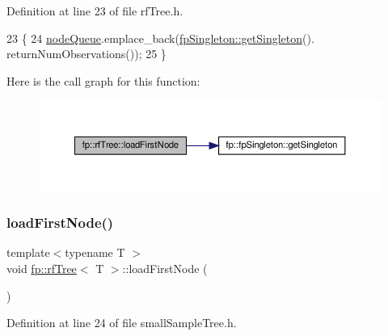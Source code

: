 Definition at line 23 of file rf\+Tree.\+h.


\begin{DoxyCode}
23                                     \{
24                     \hyperlink{classfp_1_1rfTree_af72d0a2f930fd480dfb4858885c2df23}{nodeQueue}.emplace\_back(\hyperlink{classfp_1_1fpSingleton_a8bdae77b68521003e3fc630edec2e240}{fpSingleton::getSingleton}().
      returnNumObservations());
25                 \}
\end{DoxyCode}
Here is the call graph for this function\+:
\nopagebreak
\begin{figure}[H]
\begin{center}
\leavevmode
\includegraphics[width=350pt]{classfp_1_1rfTree_a8757adc28b68d0a99f95b8bc5d6a38db_cgraph}
\end{center}
\end{figure}
\mbox{\label{classfp_1_1rfTree_a8757adc28b68d0a99f95b8bc5d6a38db}} 
\subsubsection{\texorpdfstring{load\+First\+Node()}{loadFirstNode()}\hspace{0.1cm}{\footnotesize\ttfamily [2/2]}}
{\footnotesize\ttfamily template$<$typename T $>$ \\
void \hyperlink{classfp_1_1rfTree}{fp\+::rf\+Tree}$<$ T $>$\+::load\+First\+Node (\begin{DoxyParamCaption}{ }\end{DoxyParamCaption})\hspace{0.3cm}{\ttfamily [inline]}}



Definition at line 24 of file small\+Sample\+Tree.\+h.


